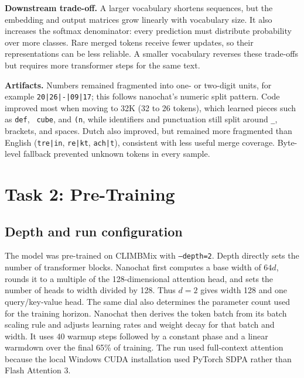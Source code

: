 \documentclass{article}
\begin{document}
\textbf{Downstream trade-off.} A larger vocabulary shortens sequences, but
the embedding and output matrices grow linearly with vocabulary size. It also
increases the softmax denominator: every prediction must distribute
probability over more classes. Rare merged tokens receive fewer updates, so
their representations can be less reliable. A smaller vocabulary reverses
these trade-offs but requires more transformer steps for the same text.

\textbf{Artifacts.} Numbers remained fragmented into one- or two-digit units,
for example \texttt{20|26|-|09|17}; this follows nanochat's numeric split
pattern. Code improved most when moving to 32K (32 to 26 tokens), which learned
pieces such as \texttt{def}, \texttt{ cube}, and \texttt{(n}, while identifiers
and punctuation still split around \texttt{\_}, brackets, and spaces. Dutch
also improved, but remained more fragmented than English
(\texttt{tre|in}, \texttt{re|kt}, \texttt{ach|t}), consistent with less useful
merge coverage. Byte-level fallback prevented unknown tokens in every sample.

\section{Task 2: Pre-Training}

\subsection{Depth and run configuration}

The model was pre-trained on CLIMBMix with \texttt{--depth=2}. Depth directly
sets the number of transformer blocks. Nanochat first computes a base width of
$64d$, rounds it to a multiple of the 128-dimensional attention head, and sets
the number of heads to width divided by 128. Thus $d=2$ gives width 128 and one
query/key-value head. The same dial also determines the parameter count used
for the training horizon. Nanochat then derives the token batch from its batch
scaling rule and adjusts learning rates and weight decay for that batch and
width. It uses 40 warmup steps followed by a constant phase and a linear
warmdown over the final 65\% of training. The run used full-context attention
because the local Windows CUDA
installation used PyTorch SDPA rather than Flash Attention 3.

\begin{table}[ht]
\centering
\small
\caption{Depth-2 model and training configuration. Training took 36.1 minutes.}
\label{tab:task2-config}
\end{table}
\end{document}

